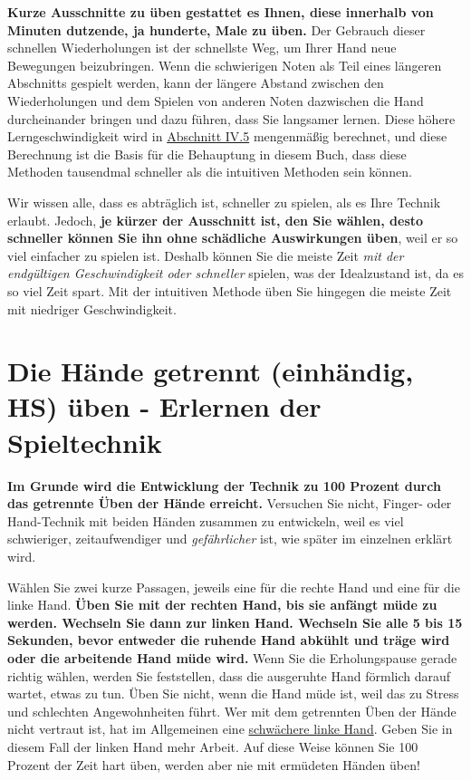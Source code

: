 \textbf{Kurze Ausschnitte zu üben gestattet es Ihnen, diese  innerhalb von Minuten dutzende, ja hunderte, Male zu üben.}
Der Gebrauch dieser schnellen Wiederholungen ist der schnellste Weg, um Ihrer Hand neue Bewegungen beizubringen.
Wenn die schwierigen Noten als Teil eines längeren Abschnitts gespielt werden, kann der längere Abstand zwischen den Wiederholungen und dem Spielen von anderen Noten dazwischen die Hand durcheinander bringen und dazu führen, dass Sie langsamer lernen.
Diese höhere Lerngeschwindigkeit wird in \hyperlink{c1iv5}{Abschnitt IV.5} mengenmäßig berechnet, und diese Berechnung ist die Basis für die Behauptung in diesem Buch, dass diese Methoden tausendmal schneller als die intuitiven Methoden sein können.

Wir wissen alle, dass es abträglich ist, schneller zu spielen, als es Ihre Technik erlaubt.
Jedoch, \textbf{je kürzer der Ausschnitt ist, den Sie wählen, desto schneller können Sie ihn ohne schädliche Auswirkungen üben}, weil er so viel einfacher zu spielen ist.
Deshalb können Sie die meiste Zeit \textit{mit der endgültigen Geschwindigkeit oder schneller} spielen, was der Idealzustand ist, da es so viel Zeit spart.
Mit der intuitiven Methode üben Sie hingegen die meiste Zeit mit niedriger Geschwindigkeit.
 

\section{Die Hände getrennt (einhändig, HS) üben - Erlernen der Spieltechnik}\hypertarget{c1ii7}{}

\textbf{Im Grunde wird die Entwicklung der Technik zu 100 Prozent durch das getrennte Üben der Hände erreicht.}
Versuchen Sie nicht, Finger- oder Hand-Technik mit beiden Händen zusammen zu entwickeln, weil es viel schwieriger, zeitaufwendiger und \textit{gefährlicher} ist, wie später im einzelnen erklärt wird.

Wählen Sie zwei kurze Passagen, jeweils eine für die rechte Hand und eine für die linke Hand.
\textbf{Üben Sie mit der rechten Hand, bis sie anfängt müde zu werden.
Wechseln Sie dann zur linken Hand.
Wechseln Sie alle 5 bis 15 Sekunden, bevor entweder die ruhende Hand abkühlt und träge wird oder die arbeitende Hand müde wird.}
Wenn Sie die Erholungspause gerade richtig wählen, werden Sie feststellen, dass die ausgeruhte Hand förmlich darauf wartet, etwas zu tun.
Üben Sie nicht, wenn die Hand müde ist, weil das zu Stress und schlechten Angewohnheiten führt.
Wer mit dem getrennten Üben der Hände nicht vertraut ist, hat im Allgemeinen eine \hyperlink{c1ii20}{schwächere linke Hand}.
Geben Sie in diesem Fall der linken Hand mehr Arbeit.
Auf diese Weise können Sie 100 Prozent der Zeit hart üben, werden aber nie mit ermüdeten Händen üben!

